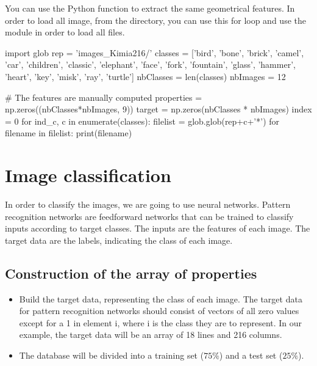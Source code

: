 \begin{pcomment}
\begin{premark}
You can use the Python function  to extract the same geometrical features. In order to load all image, from the directory, you can use this for loop and use the  module in order to load all files.

\begin{python}
import glob
rep = 'images_Kimia216/'
classes = ['bird', 'bone', 'brick', 'camel', 'car', 'children',
           'classic', 'elephant', 'face', 'fork', 'fountain',
           'glass', 'hammer', 'heart', 'key', 'misk', 'ray', 'turtle']
nbClasses = len(classes)
nbImages = 12

# The features are manually computed
properties = np.zeros((nbClasses*nbImages, 9))
target = np.zeros(nbClasses * nbImages)
index = 0
for ind_c, c in enumerate(classes):
    filelist = glob.glob(rep+c+'*')
    for filename in filelist:
        print(filename)
\end{python}

\end{premark}
\end{pcomment}




\section{Image classification}
In order to classify the images, we are going to use neural networks. Pattern recognition networks are feedforward networks that can be trained to classify inputs according to target classes.
The inputs are the features of each image. The target data are the labels, indicating the class of each image.


\subsection{Construction of the array of properties}
\begin{qbox}
\begin{itemize}
	\item Build the target data, representing the class of each image. The target data for pattern recognition networks should consist of vectors of all zero values except for a 1 in element i, where i is the class they are to represent. In our example, the target data will be an array of 18 lines and 216 columns.	
	\item The database will be divided into a training set ($75\%$) and a test set ($25\%$).
	\end{itemize}
	\end{qbox}
	
